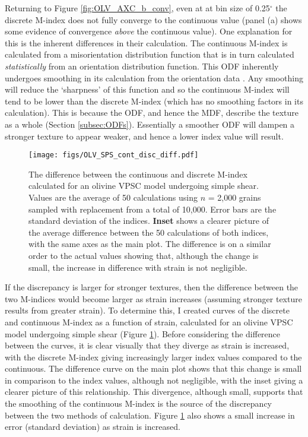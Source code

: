 \documentclass[a4paper,12pt,twoside]{report}
\numberwithin{equation}{chapter}
\begin{document}
Returning to Figure \ref{fig:OLV_AXC_b_conv}, even at at bin size of 0.25$^\circ$ the discrete M-index does not fully converge to the continuous value (panel (a) shows some evidence of convergence \emph{above} the continuous value). One explanation for this is the inherent differences in their calculation. The continuous M-index is calculated from a misorientation distribution function that is in turn calculated \emph{statistically} from an orientation distribution function. This ODF inherently undergoes smoothing in its calculation from the orientation data \citep[e.g. regularisation when inverting for the ODF in the \texttt{MTEX} algorithm, see][]{Hielscher2008}. Any smoothing will reduce the \lq{}sharpness\rq{} of this function and so the continuous M-index will tend to be lower than the discrete M-index (which has no smoothing factors in its calculation). This is because the ODF, and hence the MDF, describe the texture as a whole (Section \ref{subsec:ODFs}). Essentially a smoother ODF will dampen a stronger texture to appear weaker, and hence a lower index value will result. 

\begin{figure}[h]
  \centering
    \texttt{[image: figs/OLV\_SPS\_cont\_disc\_diff.pdf]}
  \caption[Discrete and continuous M-index difference (olivine VPSC)]{The difference between the continuous and discrete M-index calculated for an olivine VPSC model undergoing simple shear. Values are the average of 50 calculations using $n$ = 2,000 grains sampled with replacement from a total of 10,000. Error bars are the standard deviation of the indices. \textbf{Inset} shows a clearer picture of the average difference between the 50 calculations of both indices, with the same axes as the main plot. The difference is on a similar order to the actual values showing that, although the change is small, the increase in difference with strain is not negligible.}
  \label{fig:OLV_SPS_cont_disc_diff}
\end{figure}  

If the discrepancy is larger for stronger textures, then the difference between the two M-indices would become larger as strain increases (assuming stronger texture results from greater strain). To determine this, I created curves of the discrete and continuous M-index as a function of strain, calculated for an olivine VPSC model undergoing simple shear (Figure \ref{fig:OLV_SPS_cont_disc_diff}). Before considering the difference between the curves, it is clear visually that they diverge as strain is increased, with the discrete M-index giving increasingly larger index values compared to the continuous. The difference curve on the main plot shows that this change is small in comparison to the index values, although not negligible, with the inset giving a clearer picture of this relationship. This divergence, although small, supports that the smoothing of the continuous M-index is the source of the discrepancy between the two methods of calculation. Figure \ref{fig:OLV_SPS_cont_disc_diff} also shows a small increase in error (standard deviation) as strain is increased. 
\end{document}

